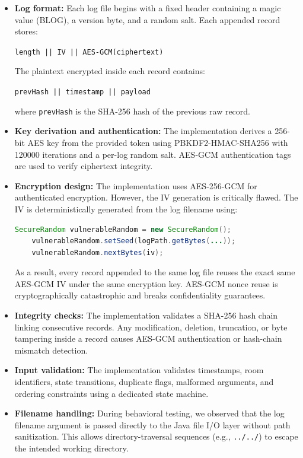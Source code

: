 \documentclass[a4paper, 12pt]{article}
\begin{document}
    \begin{itemize}
        \item \textbf{Log format:} Each log file begins with a fixed header containing a magic value (BLOG), a version byte, and a random salt. Each appended record stores:
        \begin{center}
            \texttt{length || IV || AES-GCM(ciphertext)}
        \end{center}
        The plaintext encrypted inside each record contains:
        \begin{center}
            \texttt{prevHash || timestamp || payload}
        \end{center}
        where \texttt{prevHash} is the SHA-256 hash of the previous raw record.
        \item \textbf{Key derivation and authentication:}   The implementation derives a 256-bit AES key from the provided token using PBKDF2-HMAC-SHA256 with 120000 iterations and a per-log random salt. AES-GCM authentication tags are used to verify ciphertext integrity.

        \item \textbf{Encryption design:} The implementation uses AES-256-GCM for authenticated encryption. However, the IV generation is critically flawed. The IV is deterministically generated from the log filename using:
        \begin{lstlisting}[language=Java]
    SecureRandom vulnerableRandom = new SecureRandom();
    vulnerableRandom.setSeed(logPath.getBytes(...));
    vulnerableRandom.nextBytes(iv);
        \end{lstlisting}
        As a result, every record appended to the same log file reuses the exact same AES-GCM IV under the same encryption key. AES-GCM nonce reuse is cryptographically catastrophic and breaks confidentiality guarantees.

        \item \textbf{Integrity checks:} The implementation validates a SHA-256 hash chain linking consecutive records. Any modification, deletion, truncation, or byte tampering inside a record causes AES-GCM authentication or hash-chain mismatch detection.

        \item \textbf{Input validation:} The implementation validates timestamps, room identifiers, state transitions, duplicate flags, malformed arguments, and ordering constraints using a dedicated state machine.

        \item \textbf{Filename handling:} During behavioral testing, we observed that the log filename argument is passed directly to the Java file I/O layer without path sanitization. This allows directory-traversal sequences (e.g., \texttt{../../}) to escape the intended working directory.


\end{itemize}
\end{document}
